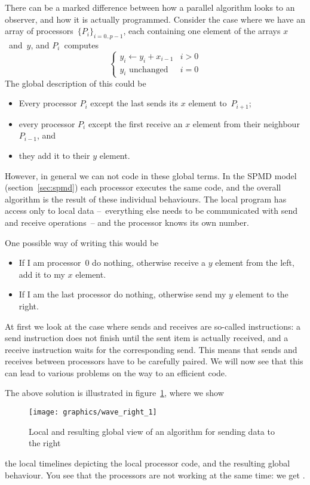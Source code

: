 There can be a marked difference between how a parallel algorithm looks to an
observer, and how it is actually programmed.
Consider the case where we have an array of processors~$\{P_i\}_{i=0..p-1}$,
each containing one element of the arrays $x$~and~$y$, and
$P_i$~computes
\begin{equation}
\begin{cases}
y_i\leftarrow y_i+x_{i-1}&i>0\\ \mbox{$y_i$ unchanged}&i=0
\end{cases}
\label{eq:mpi-send-left}
\end{equation}
The global description of this could be
\begin{itemize}
\item Every processor $P_i$ except the last sends its $x$ element to~$P_{i+1}$;
\item every processor $P_i$ except the first receive an $x$ element from
  their neighbour~$P_{i-1}$, and
\item they add it to their $y$ element.
\end{itemize}
However, in general we can not code in these global terms.
In the \ac{SPMD} model (section~\ref{sec:spmd}) each
processor executes the same code, and the overall algorithm
is the result of  these individual behaviours. 
The local program has access only to local data --~everything else
needs to be communicated with send and receive operations~-- and the
processor knows its own number.

One possible way of writing this would be
\begin{itemize}
\item If I am processor~0 do nothing, otherwise receive a $y$ element
  from the left, add it to my $x$ element.
\item If I am the last processor do nothing, otherwise send my $y$
  element to the right.
\end{itemize}
At first we look at the case where sends and
receives are so-called 
instructions: a send instruction does not finish until the sent item
is actually received, and a receive instruction waits for the
corresponding send. This means that sends and receives between
processors have to be carefully paired. We will now see that this can
lead to various problems on the way to an efficient code.

The above solution is illustrated in figure~\ref{fig:wave_right_1},
where we show
\begin{figure}
  \texttt{[image: graphics/wave\_right\_1]}
  \caption{Local and resulting global view of an algorithm for sending
    data to the right}
  \label{fig:wave_right_1}
\end{figure}
the local timelines depicting the local processor code, and the resulting
global behaviour. You see that the processors are not working at the
same time: we get .

